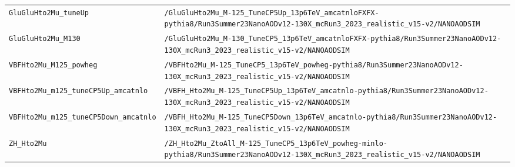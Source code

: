 \begin{longtable}{@{}>{\RaggedRight\arraybackslash}p{} >{\RaggedRight\arraybackslash}p{}@{}}
\texttt{GluGluHto2Mu\_\allowbreak{}tuneUp} & \texttt{/\allowbreak{}GluGluHto2Mu\_\allowbreak{}M-\allowbreak{}125\_\allowbreak{}TuneCP5Up\_\allowbreak{}13p6TeV\_\allowbreak{}amcatnloFXFX-\allowbreak{}pythia8/\allowbreak{}Run3Summer23NanoAODv12-\allowbreak{}130X\_\allowbreak{}mcRun3\_\allowbreak{}2023\_\allowbreak{}realistic\_\allowbreak{}v15-\allowbreak{}v2/\allowbreak{}NANOAODSIM} \\
\addlinespace[2pt]
\texttt{GluGluHto2Mu\_\allowbreak{}M130} & \texttt{/\allowbreak{}GluGluHto2Mu\_\allowbreak{}M-\allowbreak{}130\_\allowbreak{}TuneCP5\_\allowbreak{}13p6TeV\_\allowbreak{}amcatnloFXFX-\allowbreak{}pythia8/\allowbreak{}Run3Summer23NanoAODv12-\allowbreak{}130X\_\allowbreak{}mcRun3\_\allowbreak{}2023\_\allowbreak{}realistic\_\allowbreak{}v15-\allowbreak{}v2/\allowbreak{}NANOAODSIM} \\
\addlinespace[2pt]
\texttt{VBFHto2Mu\_\allowbreak{}M125\_\allowbreak{}powheg} & \texttt{/\allowbreak{}VBFHto2Mu\_\allowbreak{}M-\allowbreak{}125\_\allowbreak{}TuneCP5\_\allowbreak{}13p6TeV\_\allowbreak{}powheg-\allowbreak{}pythia8/\allowbreak{}Run3Summer23NanoAODv12-\allowbreak{}130X\_\allowbreak{}mcRun3\_\allowbreak{}2023\_\allowbreak{}realistic\_\allowbreak{}v15-\allowbreak{}v2/\allowbreak{}NANOAODSIM} \\
\addlinespace[2pt]
\texttt{VBFHto2Mu\_\allowbreak{}m125\_\allowbreak{}tuneCP5Up\_\allowbreak{}amcatnlo} & \texttt{/\allowbreak{}VBFH\_\allowbreak{}Hto2Mu\_\allowbreak{}M-\allowbreak{}125\_\allowbreak{}TuneCP5Up\_\allowbreak{}13p6TeV\_\allowbreak{}amcatnlo-\allowbreak{}pythia8/\allowbreak{}Run3Summer23NanoAODv12-\allowbreak{}130X\_\allowbreak{}mcRun3\_\allowbreak{}2023\_\allowbreak{}realistic\_\allowbreak{}v15-\allowbreak{}v2/\allowbreak{}NANOAODSIM} \\
\addlinespace[2pt]
\texttt{VBFHto2Mu\_\allowbreak{}m125\_\allowbreak{}tuneCP5Down\_\allowbreak{}amcatnlo} & \texttt{/\allowbreak{}VBFH\_\allowbreak{}Hto2Mu\_\allowbreak{}M-\allowbreak{}125\_\allowbreak{}TuneCP5Down\_\allowbreak{}13p6TeV\_\allowbreak{}amcatnlo-\allowbreak{}pythia8/\allowbreak{}Run3Summer23NanoAODv12-\allowbreak{}130X\_\allowbreak{}mcRun3\_\allowbreak{}2023\_\allowbreak{}realistic\_\allowbreak{}v15-\allowbreak{}v2/\allowbreak{}NANOAODSIM} \\
\addlinespace[2pt]
\texttt{ZH\_\allowbreak{}Hto2Mu} & \texttt{/\allowbreak{}ZH\_\allowbreak{}Hto2Mu\_\allowbreak{}ZtoAll\_\allowbreak{}M-\allowbreak{}125\_\allowbreak{}TuneCP5\_\allowbreak{}13p6TeV\_\allowbreak{}powheg-\allowbreak{}minlo-\allowbreak{}pythia8/\allowbreak{}Run3Summer23NanoAODv12-\allowbreak{}130X\_\allowbreak{}mcRun3\_\allowbreak{}2023\_\allowbreak{}realistic\_\allowbreak{}v15-\allowbreak{}v2/\allowbreak{}NANOAODSIM} \\

\end{longtable}
